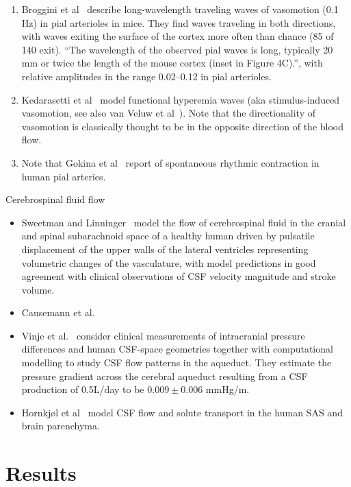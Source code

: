 \documentclass[fleqn,10pt]{wlscirep}
\begin{document}
\begin{enumerate}
\item
  Broggini et al~\cite{broggini2024long} describe long-wavelength traveling waves of vasomotion (0.1 Hz) in pial arterioles in mice. They find waves traveling in both directions, with waves exiting the surface of the cortex more often than chance (85 of 140 exit). ``The wavelength of the observed pial waves is long, typically 20 mm or twice the length of the mouse cortex (inset in Figure 4C).'', with relative amplitudes in the range 0.02--0.12 in pial arterioles.
\item
  Kedarasetti et al~\cite{kedarasetti2020functional} model functional hyperemia waves (aka stimulus-induced vasomotion, see also van Veluw et al~\cite{vanveluw2020vasomotion}). Note that the directionality of vasomotion is classically thought to be in the opposite direction of the blood flow.
\item
  Note that Gokina et al~\cite{gokina1996electrical} report of spontaneous rhythmic contraction in human pial arteries.
\end{enumerate}
Cerebrospinal fluid flow
\begin{itemize}
\item
  Sweetman and Linninger~\cite{sweetman2011cerebrospinal} model the flow of cerebrospinal fluid in the cranial and spinal subarachnoid space of a healthy human driven by pulsatile displacement of the upper walls of the lateral ventricles representing volumetric changes of the vasculature, with model predictions in good agreement with clinical observations of CSF velocity magnitude and stroke volume. 
\item Causemann et al.~\cite{causemann2022human}
\item
  Vinje et al.~\cite{vinje2019respiratory} consider clinical measurements of intracranial pressure differences and human CSF-space geometries together with computational modelling to study CSF flow patterns in the aqueduct. They estimate the pressure gradient across the cerebral aqueduct resulting from a CSF production of 0.5L/day to be $0.009 \pm 0.006$ mmHg/m.
\item Hornkjøl et al~\cite{hornkjol2022csf} model CSF flow and solute transport in the human SAS and brain parenchyma. 
\end{itemize}

\section*{Results}
\end{document}
